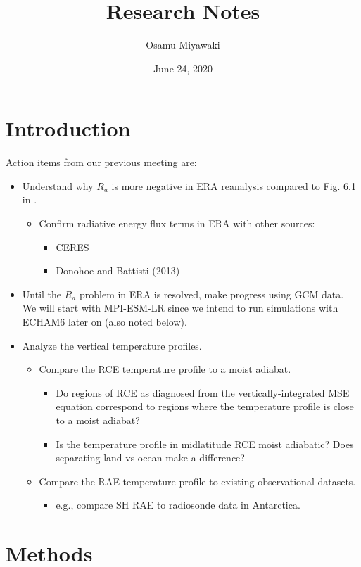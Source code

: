 \documentclass[11pt]{article}
\author{Osamu Miyawaki}
\date{June 24, 2020}
\title{Research Notes}
\begin{document}
\maketitle

\section{Introduction}
\label{sec:orgbce2332}
Action items from our previous meeting are:
\begin{itemize}
\item Understand why \(R_a\) is more negative in ERA reanalysis compared to Fig. 6.1 in \cite{hartmann_global_2016}.
\begin{itemize}
\item Confirm radiative energy flux terms in ERA with other sources:
\begin{itemize}
\item CERES
\item Donohoe and Battisti (2013)
\end{itemize}
\end{itemize}
\item Until the \(R_a\) problem in ERA is resolved, make progress using GCM data. We will start with MPI-ESM-LR since we intend to run simulations with ECHAM6 later on (also noted below).
\item Analyze the vertical temperature profiles.
\begin{itemize}
\item Compare the RCE temperature profile to a moist adiabat.
\begin{itemize}
\item Do regions of RCE as diagnosed from the vertically-integrated MSE equation correspond to regions where the temperature profile is close to a moist adiabat?
\item Is the temperature profile in midlatitude RCE moist adiabatic? Does separating land vs ocean make a difference?
\end{itemize}
\item Compare the RAE temperature profile to existing observational datasets.
\begin{itemize}
\item e.g., compare SH RAE to radiosonde data in Antarctica.
\end{itemize}
\end{itemize}
\end{itemize}

\section{Methods}
\label{sec:orgdc9e3cc}
\end{document}
